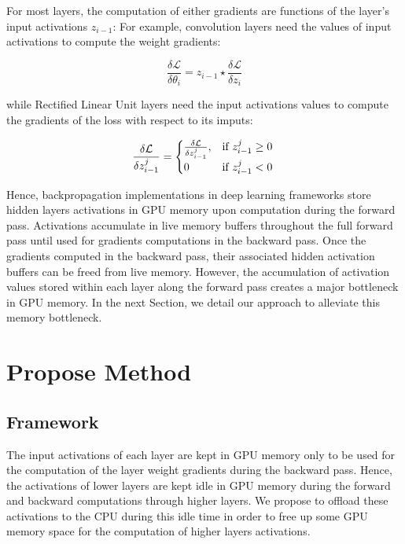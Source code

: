 \documentclass[11pt,onecolumn]{article}
\begin{document}
For most layers, the computation of either gradients are functions of the layer's input activations $z_{i-1}$:
For example, convolution layers need the values of input activations to compute the weight gradients:

\begin{equation}
\frac{\delta \mathcal{L}}{\delta \theta_i} = z_{i-1} \star \frac{\delta \mathcal{L}}{\delta z_i} 
\end{equation}

while Rectified Linear Unit layers need the input activations values 
to compute the gradients of the loss with respect to its imputs:

\begin{equation}
\frac{\delta \mathcal{L}}{\delta z_{i-1}^j}  = \begin{cases}
\frac{\delta \mathcal{L}}{\delta z_{i-1}^j}, & \text{if}\ z_{i-1}^j \geq 0 \\
0 & \text{if}\ z_{i-1}^j < 0
\end{cases} \\
\end{equation}

Hence, backpropagation implementations in deep learning frameworks
store hidden layers activations in GPU memory 
upon computation during the forward pass. 
Activations accumulate in live memory buffers throughout the full forward pass
until used for gradients computations in the backward pass. 
Once the gradients computed in the backward pass, 
their associated hidden activation buffers can be freed from live memory. 
However, the accumulation of activation values stored within each layer 
along the forward pass creates a major bottleneck in GPU memory.
In the next Section, we detail our approach to alleviate this memory bottleneck.

\section{Propose Method}
\subsection{Framework}

The input activations of each layer are kept in GPU memory only to be used for the
computation of the layer weight gradients during the backward pass. 
Hence, the activations of lower layers are kept idle in GPU memory during the
forward and backward computations through higher layers.
We propose to offload these activations to the CPU during this idle time
in order to free up some GPU memory space for the computation of higher layers activations.
\end{document}
